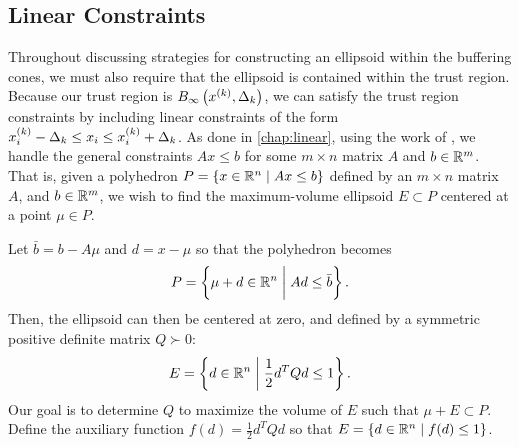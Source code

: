 \subsection{Linear Constraints}
\label{handling_linear_constraints_within_ellipsoid_programs}
Throughout discussing strategies for constructing an ellipsoid within the buffering cones, we must also require that the ellipsoid is contained within the trust region.
Because our trust region is ${ B_{\infty}\left(x^{(k)}, \Delta_k\right) }$, we can satisfy the trust region constraints by including linear constraints of the form $x^{(k)}_i - \Delta_k \le x_i \le x^{(k)}_i + \Delta_k$.
As done in \cref{chap:linear},  using the work of \cite{Khachiyan1993}, we handle the general constraints $Ax \le b$ for some $m\times n$ matrix $A$ and $b \in \mathbb R^m$.
That is, given a polyhedron $P = \{ x \in \mathbb R^n\; | \;  Ax \le b \}$ defined by an $m \times n$ matrix $A$, and $b \in \mathbb R^m$,
we wish to find the maximum-volume ellipsoid $E \subset P$ centered at a point $\mu \in P$.

Let $\bar{b} = b - A\mu$ and $d = x - \mu$ so that the polyhedron becomes
\begin{align*}
P = \left\{ \mu + d \in \mathbb R^n \; \bigg | \;  Ad \le \bar{b} \right\}.
\end{align*}
Then, the ellipsoid can then be centered at zero, and defined by a symmetric positive definite matrix $Q \succ 0$:
\begin{align*}
E =\left \{ d \in \mathbb R^n \; \bigg | \; \frac 1 2 d^T Q d \le 1 \right\}.
\end{align*}
Our goal is to determine $Q$ to maximize the volume of $E$ such that $\mu + E \subset P$.
Define the auxiliary function $f(d) = \frac 1 2 d^T Q d$ so that $E = \{ d \in \mathbb R^n\; | \; f(d) \le 1 \}$.

